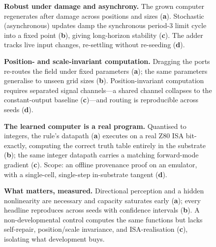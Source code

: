 \begin{figure}[p]\centering
{}
\caption{\textbf{Robust under damage and asynchrony.} The grown computer regenerates after damage across positions and sizes (\textbf{a}). Stochastic (asynchronous) updates damp the synchronous period-3 limit cycle into a fixed point (\textbf{b}), giving long-horizon stability (\textbf{c}). The adder tracks live input changes, re-settling without re-seeding (\textbf{d}).}
\label{fig:robust}
\end{figure}

\begin{figure}[p]\centering
{}
\caption{\textbf{Position- and scale-invariant computation.} Dragging the ports re-routes the field under fixed parameters (\textbf{a}); the same parameters generalise to unseen grid sizes (\textbf{b}). Position-invariant computation requires separated signal channels---a shared channel collapses to the constant-output baseline (\textbf{c})---and routing is reproducible across seeds (\textbf{d}).}
\label{fig:invariance}
\end{figure}

\begin{figure}[p]\centering
{}
\caption{\textbf{The learned computer is a real program.} Quantised to integers, the rule's datapath (\textbf{a}) executes on a real Z80 ISA bit-exactly, computing the correct truth table entirely in the substrate (\textbf{b}); the same integer datapath carries a matching forward-mode gradient (\textbf{c}). Scope: an offline provenance proof on an emulator, with a single-cell, single-step in-substrate tangent (\textbf{d}).}
\label{fig:substrate}
\end{figure}

\begin{figure}[p]\centering
{}
\caption{\textbf{What matters, measured.} Directional perception and a hidden nonlinearity are necessary and capacity saturates early (\textbf{a}); every headline reproduces across seeds with confidence intervals (\textbf{b}). A non-developmental control computes the same functions but lacks self-repair, position/scale invariance, and ISA-realisation (\textbf{c}), isolating what development buys.}
\label{fig:ablation}
\end{figure}
